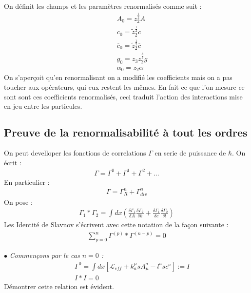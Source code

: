 \documentclass[a4paper,11pt]{article}
\theoremstyle{plain}
\theoremstyle{definition}
\theoremstyle{remark}
\numberwithin{equation}{section}
\numberwithin{equation}{subsection}
\numberwithin{figure}{section}
\begin{document}
On définit les champs et les paramètres renormalisés comme suit :
\begin{eqnarray}
 && A_{0} = z_{2}^{\frac{1}{2}} A  \\
 && c_{0} = \tilde{z}_{2}^{\frac{1}{2}} c  \\
 && \overline{c}_{0} = \tilde{z}_{2}^{\frac{1}{2}} \overline{c} \\
 && g_{0} = z_{3}z_{2}^{\frac{3}{2}} g \\
 && \alpha_{0} = z_{2} \alpha
\end{eqnarray}
On s'aperçoit qu'en renormalisant on a modifié les coefficients mais on a pas toucher aux opérateurs, qui eux restent les mêmes. 
En fait ce que l'on mesure ce sont sont ces coefficients renormalisés, ceci traduit l'action des interactions mise en jeu entre 
les particules. 

\subsection{Preuve de la renormalisabilité à tout les ordres}


\noindent
On peut develloper les fonctions de correlations $\Gamma$ en serie de puissance de $\hbar$. On écrit :
\begin{eqnarray}
 \Gamma = \Gamma^{0} + \Gamma^{1} + \Gamma^{2} + ...
\end{eqnarray}
En particulier : 
\begin{eqnarray}
 \Gamma = \Gamma_{R}^{n} + \Gamma^{n}_{div}
\end{eqnarray}
On pose :
\begin{eqnarray}
 \Gamma_1 * \Gamma_2 = \int dx \left( \frac{\delta \Gamma_{1}}{\delta A} \frac{\delta \Gamma_{2}}{\delta k} 
+ \frac{\delta \Gamma_{1}}{\delta c} \frac{\delta \Gamma_{2}}{\delta l} \right)
\end{eqnarray}
Les Identité de Slavnov  s'écrivent avec cette notation de la façon suivante :
\begin{eqnarray}
 \sum_{p=0}^{n} \Gamma^{(p)} * \Gamma^{(n-p)} = 0
\end{eqnarray}

\noindent
$\bullet$ \textit{Commençons par le cas $n=0$ :}
\begin{eqnarray}
 && \Gamma^{0} = \int dx \left[ \mathcal{L}_{eff} + k^{\mu}_{a} s A^{a}_{\mu} - l^{a} s c^{a} \right] := I\\
 && I*I = 0
\end{eqnarray}
Démontrer cette relation est évident. \\
\end{document}
